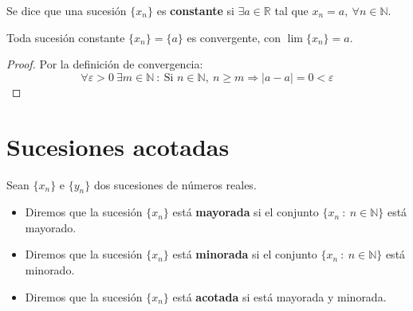 \begin{definicion}
    Se dice que una sucesión $\{x_n\}$  es \textbf{constante} si $\exists a \in \mathbb{R}$ tal que $x_n=a,~\forall n \in \mathbb{N}$.
\end{definicion}
\begin{lema}
    Toda sucesión constante $\{x_n\}=\{a\}$ es convergente, con $\lim \{x_n\} = a$.
\end{lema}
\begin{proof}
    Por la definición de convergencia:
    \begin{equation*}
        \forall \varepsilon > 0 ~\exists m \in \mathbb{N} ~:~ \text{Si $n \in \mathbb{N}$},~n \geq m \Longrightarrow \left| a - a \right|=0 < \varepsilon
    \end{equation*}
\end{proof}



\section{Sucesiones acotadas}
\begin{definicion}
    Sean $\{x_n\}$ e $\{y_n\}$ dos sucesiones de números reales.
    \begin{itemize}
        \item Diremos que la sucesión $\{x_n\}$ está \textbf{mayorada} si el conjunto $\{x_n~:~n \in \mathbb{N}\}$ está mayorado.

        \item Diremos que la sucesión $\{x_n\}$ está \textbf{minorada} si el conjunto $\{x_n~:~n \in \mathbb{N}\}$ está minorado.

        \item Diremos que la sucesión $\{x_n\}$ está \textbf{acotada} si está mayorada y minorada.
    \end{itemize}
\end{definicion}

